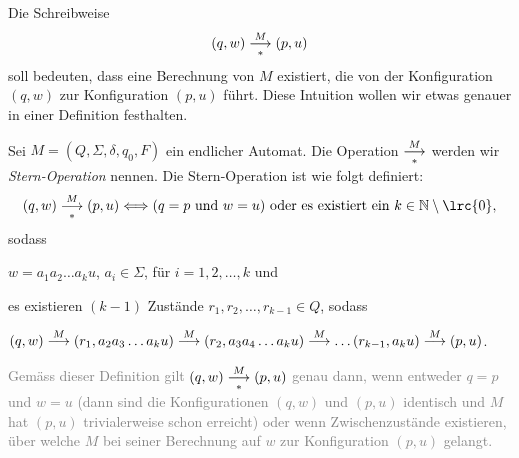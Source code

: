 Die Schreibweise
\begin{equation*}
	(q,w) \underset{*}{\overset{M}{\longrightarrow}} (p,u)
\end{equation*}
soll bedeuten, dass eine Berechnung von $M$ existiert, die von der Konfiguration $(q,w)$ zur Konfiguration $(p,u)$ führt. Diese Intuition wollen wir etwas genauer in einer Definition festhalten.
\begin{mydefinition}\label{mydefinition:transitive_hull}
Sei $M = (Q,\Sigma, \delta, q_0, F)$ ein endlicher Automat. Die Operation $\underset{*}{\overset{M}{\longrightarrow}}$  werden wir \textit{Stern-Operation} nennen. Die Stern-Operation ist wie folgt definiert:
\begin{align*}
	(q,w) \hull{M} (p,u) \Longleftrightarrow (q = p\text{ und } w = u)\text{ oder es existiert ein } k\in\mathbb{N}\setminus\lrc{0},
\end{align*}
sodass
\begin{renum}
	\item $w = a_1a_2\ldots a_ku$, $a_i\in\Sigma$, für $i = 1,2,\ldots ,k$ und
	\item es existieren $(k-1)$ Zustände $r_1, r_2, \ldots , r_{k-1}\in Q$, sodass

	$(q,w)\overset{M}{\longrightarrow}(r_1,a_2a_3\ldots a_ku)\overset{M}{\longrightarrow}(r_2,a_3a_4\ldots a_ku)\overset{M}{\longrightarrow}\ldots (r_{k-1},a_ku)\overset{M}{\longrightarrow} (p,u)$.
\end{renum}
\textcolor{Gray}{Gemäss dieser Definition gilt $(q,w) \underset{*}{\overset{M}{\longrightarrow}} (p,u)$ genau dann, wenn entweder $q = p $ und $w = u$ (dann sind die Konfigurationen $(q,w)$ und $(p,u)$ identisch und $M$ hat $(p,u)$ trivialerweise schon erreicht) oder wenn Zwischenzustände existieren, über welche $M$ bei seiner Berechnung auf $w$ zur Konfiguration $(p,u)$ gelangt.}
\end{mydefinition}

